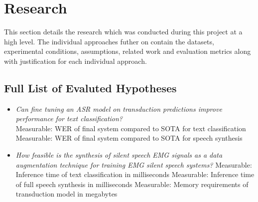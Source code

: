 \chapter{Research} \label{chap:research}

This section details the research which was conducted during this project
at a high level. The individual approaches futher on contain the datasets,
experimental conditions, assumptions, related work and evaluation metrics
along with justification for each individual approach.

\section{Full List of Evaluted Hypotheses}

\begin{itemize}
    \item \textit{Can fine tuning an ASR model on transduction predictions
    improve performance for text classification?} \\
    Measurable: WER of final system compared to SOTA for text classification \\
    Measurable: WER of final system compared to SOTA for speech synthesis
    \item \textit{How feasible is the synthesis of silent speech EMG signals
    as a data augmentation technique for training EMG silent speech systems?}
    Measurable: Inference time of text classification in milliseconds
    Measurable: Inference time of full speech synthesis in milliseconds
    Measurable: Memory requirements of transduction model in megabytes
\end{itemize}